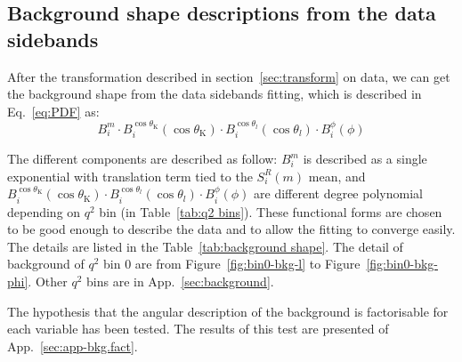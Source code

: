 \subsection{Background shape descriptions from the data sidebands}
\label{sec:background shape}

After the transformation described in section~\ref{sec:transform} on
data, we can get the background shape from the data sidebands fitting,
which is described in Eq.~\ref{eq:PDF} as:
$$B_i^m \cdot B_i^{\cos\theta_\mathrm{K}}(\cos\theta_\mathrm{K}) \cdot
B_i^{\cos\theta_l}(\cos\theta_l) \cdot B_i^{\phi}(\phi) $$

The different components are described as follow:
$B_i^m$ is described as a single exponential with
translation term tied to the $S^R_i(m)$ mean, and
$B_i^{\cos\theta_\mathrm{K}}(\cos\theta_\mathrm{K}) \cdot
B_i^{\cos\theta_l}(\cos\theta_l) \cdot B_i^{\phi}(\phi)$ are different
degree polynomial depending on $q^2$ bin (in Table~\ref{tab:q2 bins}).
These functional forms are chosen to be good enough to describe the
data and to allow the fitting to converge easily. The details are
listed in the Table~\ref{tab:background shape}. The detail of background 
of $q^2$ bin 0 are from Figure~\ref{fig:bin0-bkg-l} to Figure~\ref{fig:bin0-bkg-phi}.
Other $q^2$ bins are in App.~\ref{sec:background}.

The hypothesis that the angular description of the background is factorisable for each variable has been tested. The results of this test are presented of App.~\ref{sec:app-bkg.fact}.

